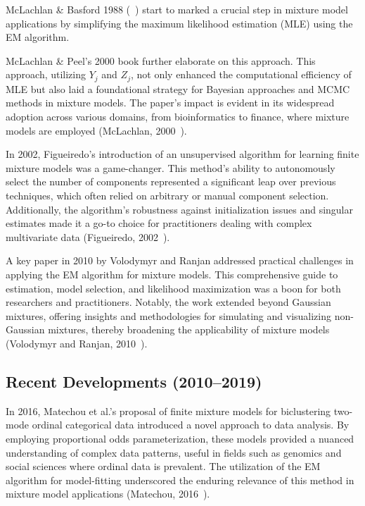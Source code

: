 \documentclass{article}
\begin{document}
McLachlan \& Basford 1988 (~\cite{mclachlan1988mixture}) start to marked a crucial step in mixture model applications by simplifying the maximum likelihood estimation (MLE) using the EM algorithm.

McLachlan \& Peel's 2000 book further elaborate on this approach. This approach, utilizing $Y_j$ and $Z_j$, not only enhanced the computational efficiency of MLE but also laid a foundational strategy for Bayesian approaches and MCMC methods in mixture models. The paper’s impact is evident in its widespread adoption across various domains, from bioinformatics to finance, where mixture models are employed (McLachlan, 2000~\cite{mclachlan2000finite}).

In 2002, Figueiredo's introduction of an unsupervised algorithm for learning finite mixture models was a game-changer. This method's ability to autonomously select the number of components represented a significant leap over previous techniques, which often relied on arbitrary or manual component selection. Additionally, the algorithm's robustness against initialization issues and singular estimates made it a go-to choice for practitioners dealing with complex multivariate data (Figueiredo, 2002~\cite{figueiredo2002unsupervised}).

A key paper in 2010 by Volodymyr and Ranjan addressed practical challenges in applying the EM algorithm for mixture models. This comprehensive guide to estimation, model selection, and likelihood maximization was a boon for both researchers and practitioners. Notably, the work extended beyond Gaussian mixtures, offering insights and methodologies for simulating and visualizing non-Gaussian mixtures, thereby broadening the applicability of mixture models (Volodymyr and Ranjan, 2010~\cite{10.1214/09-SS053}).

\subsection*{Recent Developments (2010--2019)}

In 2016, Matechou et al.'s proposal of finite mixture models for biclustering two-mode ordinal categorical data introduced a novel approach to data analysis. By employing proportional odds parameterization, these models provided a nuanced understanding of complex data patterns, useful in fields such as genomics and social sciences where ordinal data is prevalent. The utilization of the EM algorithm for model-fitting underscored the enduring relevance of this method in mixture model applications (Matechou, 2016~\cite{matechou2016biclustering}).
\end{document}
